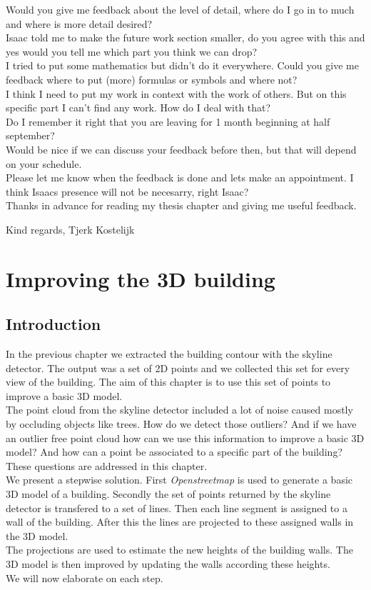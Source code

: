 \documentclass[10pt]{article}
\begin{document}
Would you give me feedback about the level of detail, where do I go in to much and where is more detail desired?\\
Isaac told me to make the future work section smaller, do you agree with this and yes would you tell me which part you think we can drop?\\
I tried to put some mathematics but didn't do it everywhere. Could you give me feedback where to put (more) formulas or symbols and where not?\\
I think I need to put my work in context with the work of others. But on this specific part I can't find any work. How do I deal with that?\\
Do I remember it right that you are leaving for 1 month beginning at half september?\\
Would be nice if we can discuss your feedback before then, but that will depend on your schedule.\\
Please let me know when the feedback is done and lets make an appointment. I think Isaacs presence will not be necesarry, right Isaac?\\

Thanks in advance for reading my thesis chapter and giving me useful feedback.

Kind regards,
Tjerk Kostelijk
 
\section{Improving the 3D building}
\subsection{Introduction}
In the previous chapter we extracted the building contour with the skyline
detector. The output was a set of 2D points and we collected this set for every
view of the building.  The aim of this chapter is to use this set of points to
improve a basic 3D model. \\
The point cloud from the skyline detector included a lot of noise caused mostly
by occluding objects like trees. How do we detect those outliers?
And if we have an outlier free point cloud how can we use this information to
improve a basic 3D model? And how can a point be associated to a specific part of the
building?  These questions are addressed in this chapter.\\
We present a stepwise solution. First \emph{Openstreetmap} is used to generate
a basic 3D model of a building. Secondly the set of points returned by the
skyline detector is transfered to a set of lines. Then each line segment is
assigned to a wall of the building. After this the lines are projected to these
assigned walls in the 3D model. \\
The projections are used to estimate the new heights of the building walls.
The 3D model is then improved by updating the walls according these heights. \\
We will now elaborate on each step.\\
\end{document}
